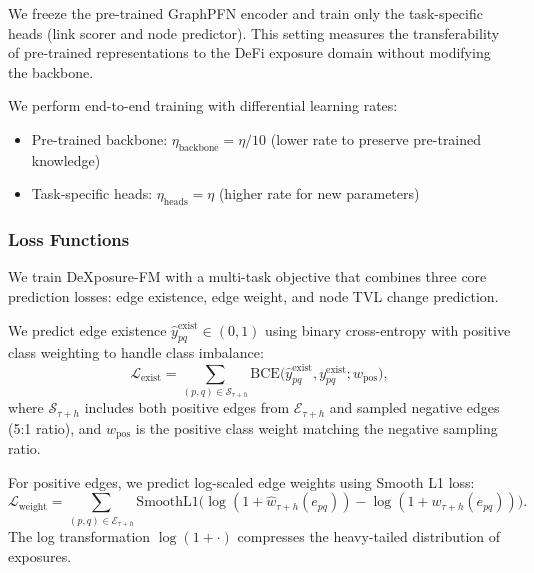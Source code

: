 \documentclass[preprint,12pt]{elsarticle}
\renewcommand{\paragraph}[1]{}
\begin{document}
\paragraph{Frozen probing.}
We freeze the pre-trained GraphPFN encoder and train only the task-specific heads (link scorer and node predictor). This setting measures the transferability of pre-trained representations to the DeFi exposure domain without modifying the backbone.

\paragraph{Fine-tuning.}
We perform end-to-end training with differential learning rates:
\begin{itemize}
  \item Pre-trained backbone: $\eta_{\text{backbone}} = \eta / 10$ (lower rate to preserve pre-trained knowledge)
  \item Task-specific heads: $\eta_{\text{heads}} = \eta$ (higher rate for new parameters)
\end{itemize}

\subsubsection{Loss Functions}
\label{sec:training:loss}

We train DeXposure-FM with a multi-task objective that combines three core prediction losses: edge existence, edge weight, and node TVL change prediction.

\paragraph{Edge existence loss (link prediction).}
We predict edge existence $\widehat{y}^{\mathrm{exist}}_{pq} \in (0,1)$ using binary cross-entropy with positive class weighting to handle class imbalance:
\begin{equation}
\mathcal L_{\mathrm{exist}} = \sum_{(p,q) \in \mathcal S_{\tau+h}} \mathrm{BCE}\bigl(\widehat{y}^{\mathrm{exist}}_{pq}, y^{\mathrm{exist}}_{pq}; w_{\mathrm{pos}}\bigr),
\label{eq:loss-exist}
\end{equation}
where $\mathcal S_{\tau+h}$ includes both positive edges from $\mathcal E_{\tau+h}$ and sampled negative edges (5:1 ratio), and $w_{\mathrm{pos}}$ is the positive class weight matching the negative sampling ratio.

\paragraph{Edge weight loss.}
For positive edges, we predict log-scaled edge weights using Smooth L1 loss:
\begin{equation}
\mathcal L_{\mathrm{weight}} = \sum_{(p,q) \in \mathcal E_{\tau+h}} \mathrm{SmoothL1}\bigl(\log(1+\widehat{w}_{\tau+h}(e_{pq})) - \log(1+w_{\tau+h}(e_{pq}))\bigr).
\label{eq:loss-weight}
\end{equation}
The log transformation $\log(1+\cdot)$ compresses the heavy-tailed distribution of exposures.
\end{document}
